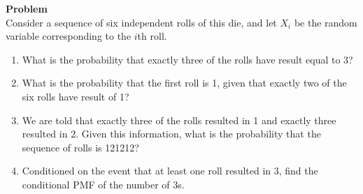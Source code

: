 \documentclass[12pt]{article}
\newenvironment{Ex}{\textbf{Problem}\vspace{.75em}\\}{}
\begin{document}
\begin{enumerate}
\begin{Ex}
    Consider a sequence of six independent rolls of this die, and
    let $X_i$ be the random variable corresponding to the $i$th
    roll.
    \begin{enumerate}
    \item What is the probability that exactly three of the rolls
      have result equal to 3?
    \item What is the probability that the first roll is 1, given
      that exactly two of the six rolls have result of 1?
    \item We are told that exactly three of the rolls resulted in 1
      and exactly three resulted in 2. Given this information, what
      is the probability that the sequence of rolls is 121212?
    \item Conditioned on the event that at least one roll resulted
      in 3, find the conditional PMF of the number of 3s.
    \end{enumerate}
  \end{Ex}
\end{enumerate}
\end{document}
